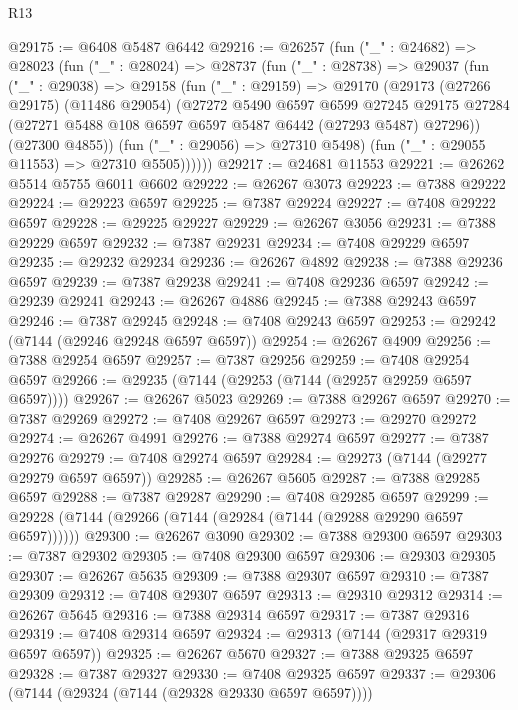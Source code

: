 \begin{lexlean}{R13}
\begin{coremodule}
@29175 := @6408 @5487 @6442
@29216 := @26257
    (fun ("_" : @24682) =>
    @28023
      (fun ("_" : @28024) =>
      @28737
        (fun ("_" : @28738) =>
        @29037
          (fun ("_" : @29038) =>
          @29158
            (fun ("_" : @29159) =>
            @29170
              (@29173
                (@27266 @29175)
                (@11486 @29054)
                (@27272
                  @5490
                  @6597
                  @6599
                  @27245
                  @29175
                  @27284
                  (@27271 @5488 @108 @6597 @6597 @5487 @6442 (@27293 @5487) @27296))
                (@27300 @4855))
              (fun ("_" : @29056) => @27310 @5498)
              (fun ("_" : @29055 @11553) => @27310 @5505))))))
@29217 := @24681 @11553
@29221 := @26262 @5514 @5755 @6011 @6602
@29222 := @26267 @3073
@29223 := @7388 @29222
@29224 := @29223 @6597
@29225 := @7387 @29224
@29227 := @7408 @29222 @6597
@29228 := @29225 @29227
@29229 := @26267 @3056
@29231 := @7388 @29229 @6597
@29232 := @7387 @29231
@29234 := @7408 @29229 @6597
@29235 := @29232 @29234
@29236 := @26267 @4892
@29238 := @7388 @29236 @6597
@29239 := @7387 @29238
@29241 := @7408 @29236 @6597
@29242 := @29239 @29241
@29243 := @26267 @4886
@29245 := @7388 @29243 @6597
@29246 := @7387 @29245
@29248 := @7408 @29243 @6597
@29253 := @29242 (@7144 (@29246 @29248 @6597 @6597))
@29254 := @26267 @4909
@29256 := @7388 @29254 @6597
@29257 := @7387 @29256
@29259 := @7408 @29254 @6597
@29266 := @29235 (@7144 (@29253 (@7144 (@29257 @29259 @6597 @6597))))
@29267 := @26267 @5023
@29269 := @7388 @29267 @6597
@29270 := @7387 @29269
@29272 := @7408 @29267 @6597
@29273 := @29270 @29272
@29274 := @26267 @4991
@29276 := @7388 @29274 @6597
@29277 := @7387 @29276
@29279 := @7408 @29274 @6597
@29284 := @29273 (@7144 (@29277 @29279 @6597 @6597))
@29285 := @26267 @5605
@29287 := @7388 @29285 @6597
@29288 := @7387 @29287
@29290 := @7408 @29285 @6597
@29299 := @29228 (@7144 (@29266 (@7144 (@29284 (@7144 (@29288 @29290 @6597 @6597))))))
@29300 := @26267 @3090
@29302 := @7388 @29300 @6597
@29303 := @7387 @29302
@29305 := @7408 @29300 @6597
@29306 := @29303 @29305
@29307 := @26267 @5635
@29309 := @7388 @29307 @6597
@29310 := @7387 @29309
@29312 := @7408 @29307 @6597
@29313 := @29310 @29312
@29314 := @26267 @5645
@29316 := @7388 @29314 @6597
@29317 := @7387 @29316
@29319 := @7408 @29314 @6597
@29324 := @29313 (@7144 (@29317 @29319 @6597 @6597))
@29325 := @26267 @5670
@29327 := @7388 @29325 @6597
@29328 := @7387 @29327
@29330 := @7408 @29325 @6597
@29337 := @29306 (@7144 (@29324 (@7144 (@29328 @29330 @6597 @6597))))

\end{coremodule}
\end{lexlean}
